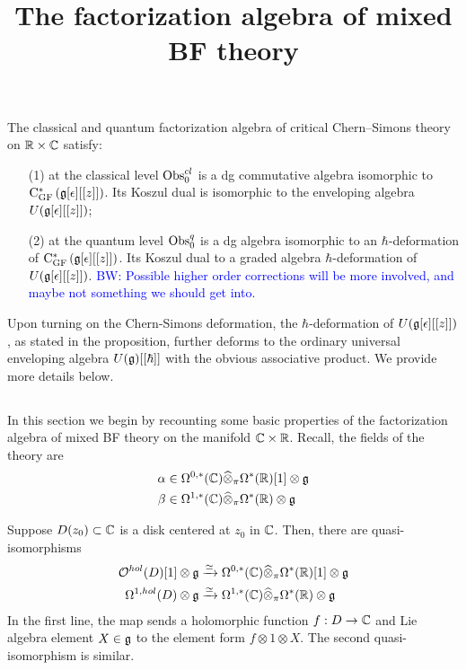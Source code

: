 \documentclass[11pt]{amsart}
\numberwithin{equation}{section}
\def\brian{\textcolor{blue}{BW: }\textcolor{blue}}
\def\GF{{\rm GF}}
\begin{document}
\title{The factorization algebra of mixed BF theory}

\maketitle

\begin{prop} 
The classical and quantum factorization algebra of critical Chern--Simons theory on $\mathbb R \times \mathbb C$ satisfy:
\begin{enumerate}
\item[(1)]
at the classical level ${\rm Obs}^{cl}_{0}$ is a dg commutative algebra isomorphic to ${\rm C}_{\GF}^* \left(\fg[\epsilon][[z]]\right)$. Its Koszul dual is isomorphic to the enveloping algebra $U(\mathfrak g[\epsilon][[z]])$;
\item[(2)] at the quantum level ${\rm Obs}^{q}_{0}$ is a dg algebra isomorphic to an $\hbar$-deformation of ${\rm C}_{\GF}^* \left(\fg[\epsilon][[z]]\right)$.
Its Koszul dual to a graded algebra $\hbar$-deformation of $U(\mathfrak g[\epsilon][[z]])$. 
\brian{Possible higher order corrections will be more involved, and maybe not something we should get into.}
\end{enumerate}
\end{prop}

\begin{rmk} 
Upon turning on the Chern-Simons deformation, the $\hbar$-deformation of $U(\mathfrak g[\epsilon][[z]])$, as stated in the proposition, further deforms to the ordinary universal enveloping algebra $U(\mathfrak g)[[\hbar]]$ with the obvious associative product. 
We provide more details below. 
\end{rmk}

\subsection{}

In this section we begin by recounting some basic properties of the factorization algebra of mixed BF theory on the manifold $\mathbb C \times \mathbb R$. 
Recall, the fields of the theory are 
\begin{align*}
\alpha & \in \Omega^{0,*}(\mathbb C) \widehat{\otimes}_\pi \Omega^*(\mathbb R)[1] \otimes \mathfrak g \\
\beta & \in \Omega^{1,*}(\mathbb C) \widehat{\otimes}_\pi \Omega^*(\mathbb R) \otimes \mathfrak g
\end{align*}

Suppose $D(z_0) \subset \mathbb C$ is a disk centered at $z_0$ in $\mathbb C$. 
Then, there are quasi-isomorphisms 
\begin{align*}
\mathcal O^{hol}(D) [1] \otimes \mathfrak g & \xrightarrow{\simeq} \Omega^{0,*}(\mathbb C) \widehat{\otimes}_\pi \Omega^*(\mathbb R)[1] \otimes \mathfrak g \\
\Omega^{1,hol}(D) \otimes \mathfrak g & \xrightarrow{\simeq} \Omega^{1,*}(\mathbb C) \widehat{\otimes}_\pi \Omega^*(\mathbb R) \otimes \mathfrak g
\end{align*}
In the first line, the map sends a holomorphic function $f : D \to \mathbb C$ and Lie algebra element $X \in \mathfrak g$ to the element form $f \otimes 1 \otimes X$.
The second quasi-isomorphism is similar. 
\end{document}
